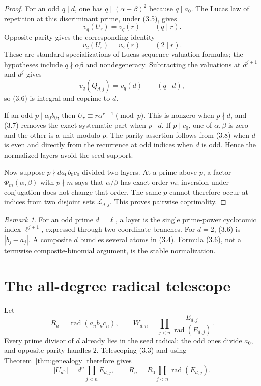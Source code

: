 \documentclass[11pt]{article}
\theoremstyle{definition}
\theoremstyle{remark}
\newtheorem{remark}[theorem]{Remark}
\newcommand{\rad}{\operatorname{rad}}
\begin{document}
\begin{proof}
For an odd $q\mid d$, one has \(q\mid(\alpha-\beta)^2\) because
\(q\mid a_0\).  The Lucas law of repetition at this discriminant prime,
under (3.5), gives
\[
 v_q(U_r)=v_q(r)\qquad(q\mid r).
 \tag{3.7}
\]
Opposite parity gives the corresponding identity
\[
 v_2(U_r)=v_2(r)\qquad(2\mid r).
 \tag{3.8}
\]
These are standard specializations of Lucas-sequence valuation formulas;
the hypotheses include $q\nmid\alpha\beta$ and nondegeneracy.  Subtracting
the valuations at $d^{j+1}$ and $d^j$ gives
\[
 v_q(Q_{d,j})=v_q(d)\qquad(q\mid d),
\]
so (3.6) is integral and coprime to $d$.

If an odd $p\mid a_0b_0$, then
\(U_r\equiv r\alpha^{r-1}\pmod p\).  This is nonzero when $p\nmid d$,
and (3.7) removes the exact systematic part when $p\mid d$.  If
\(p\mid c_0\), one of \(\alpha,\beta\) is zero and the other is a unit
modulo $p$.  The parity assertion follows from (3.8) when $d$ is even
and directly from the recurrence at odd indices when $d$ is odd.  Hence
the normalized layers avoid the seed support.

Now suppose $p\nmid d a_0b_0c_0$ divided two layers.  At a prime above
$p$, a factor \(\Phi_m(\alpha,\beta)\) with $p\nmid m$ says that
\(\alpha/\beta\) has exact order $m$; inversion under conjugation does
not change that order.  The same $p$ cannot therefore occur at indices
from two disjoint sets \(\mathcal L_{d,j}\).  This proves pairwise
coprimality.
\end{proof}

\begin{remark}
For an odd prime $d=\ell$, a layer is the single prime-power
cyclotomic index \(\ell^{j+1}\), expressed through two coordinate
branches.  For $d=2$, (3.6) is \(|b_j-a_j|\).  A composite $d$ bundles
several atoms in (3.4).  Formula (3.6), not a termwise composite-binomial
argument, is the stable normalization.
\end{remark}

\section{The all-degree radical telescope}

Let
\[
 R_n=\rad(a_nb_nc_n),\qquad
 W_{d,n}=\prod_{j<n}\frac{E_{d,j}}{\rad(E_{d,j})}.
 \tag{4.1}
\]
Every prime divisor of $d$ already lies in the seed radical: the odd
ones divide $a_0$, and opposite parity handles $2$.  Telescoping (3.3)
and using Theorem~\ref{thm:genealogy} therefore gives
\[
 |U_{d^n}|=d^n\prod_{j<n}E_{d,j},\qquad
 R_n=R_0\prod_{j<n}\rad(E_{d,j}).
 \tag{4.2}
\]
\end{document}
